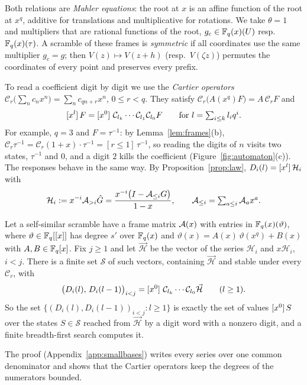 Both relations are \emph{Mahler equations}: the root at $x$ is an affine function of the root at $x^q$, additive for translations and multiplicative for rotations. We take $\theta=1$ and multipliers that are rational functions of the root, $g_c\in\mathbb{F}_q(x)(U)$ resp.\ $\mathbb{F}_q(x)(\tau)$. A scramble of these frames is \emph{symmetric} if all coordinates use the same multiplier $g_c=g$; then $V(z)\mapsto V(z+h)$ (resp.\ $V(\zeta z)$) permutes the coordinates of every point and preserves every prefix.

To read a coefficient digit by digit we use the \emph{Cartier operators} $\mathcal C_r\bigl(\sum_nc_nx^n\bigr)=\sum_nc_{qn+r}x^n$, $0\le r<q$. They satisfy $\mathcal C_r\bigl(A(x^q)F\bigr)=A\,\mathcal C_rF$ and
\begin{equation}\label{eq:cartierread}
[x^{l}]\,F=[x^{0}]\,\,\mathcal C_{l_k}\cdots\mathcal C_{l_1}\mathcal C_{l_0}F\qquad\text{for }l=\textstyle\sum_{i\le k}l_iq^i.
\end{equation}
For example, $q=3$ and $F=\tau^{-1}$: by Lemma~\ref{lem:frames}(b), $\mathcal C_r\tau^{-1}=\mathcal C_r(1+x)\cdot\tau^{-1}=[r\le1]\,\tau^{-1}$, so reading the digits of $n$ visits two states, $\tau^{-1}$ and $0$, and a digit $2$ kills the coefficient (Figure~\ref{fig:automaton}(c)). The responses behave in the same way. By Proposition~\ref{prop:law}, $D_i(l)=[x^{l}]\,\mathcal H_i$ with
\[
\mathcal H_i:=x^{-i}\mathcal{A}_{>i}\hat G=\frac{x^{-i}\bigl(I-\mathcal{A}_{\le i}G\bigr)}{1-x},\qquad \mathcal{A}_{\le i}=\textstyle\sum_{a\le i}\mathcal{A}_ax^a .
\]

\begin{proposition}\label{prop:automaton}
Let a self-similar scramble have a frame matrix $\mathcal{A}(x)$ with entries in $\mathbb{F}_q(x)(\vartheta)$, where $\vartheta\in\mathbb{F}_q[[x]]$ has degree $s'$ over $\mathbb{F}_q(x)$ and $\vartheta(x)=A(x)\,\vartheta(x^q)+B(x)$ with $A,B\in\mathbb{F}_q[x]$. Fix $j\ge1$ and let $\vec{\mathcal H}$ be the vector of the series $\mathcal H_i$ and $x\mathcal H_i$, $i<j$. There is a finite set $\mathcal S$ of such vectors, containing $\vec{\mathcal H}$ and stable under every $\mathcal C_r$, with
\[
\bigl(D_i(l),\,D_i(l-1)\bigr)_{i<j}=[x^{0}]\,\,\mathcal C_{l_k}\cdots\mathcal C_{l_0}\vec{\mathcal H}\qquad(l\ge1).
\]
So the set $\{(D_i(l),D_i(l-1))_{i<j}:l\ge1\}$ is exactly the set of values $[x^{0}]\,S$ over the states $S\in\mathcal S$ reached from $\vec{\mathcal H}$ by a digit word with a nonzero digit, and a finite breadth-first search computes it.
\end{proposition}

The proof (Appendix~\ref{app:smallbases}) writes every series over one common denominator and shows that the Cartier operators keep the degrees of the numerators bounded.

